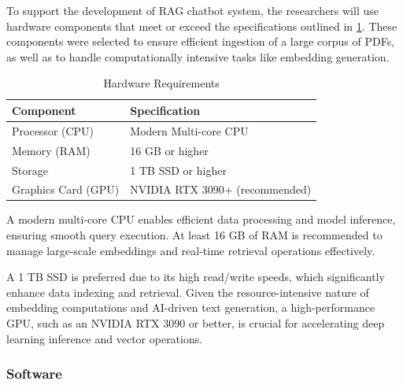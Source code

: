 \begin{refsection}
To support the development of RAG chatbot system, the researchers will use hardware components that meet or exceed the specifications outlined in \ref{tab:hardware_requirements}. These components were selected to ensure efficient ingestion of a large corpus of PDFs, as well as to handle computationally intensive tasks like embedding generation.

\begin{table}[H]
    \centering
    \caption{Hardware Requirements}
    \label{tab:hardware_requirements}
    \begin{tabular}{ll}
        \hline
        \textbf{Component}       & \textbf{Specification}                     \\ \hline
        Processor (CPU)          & Modern Multi-core CPU                      \\
        Memory (RAM)             & 16 GB or higher                            \\
        Storage                  & 1 TB SSD or higher                         \\
        Graphics Card (GPU)      & NVIDIA RTX 3090+ (recommended)             \\
        \hline
    \end{tabular}
\end{table}

A modern multi-core CPU enables efficient data processing and model inference, ensuring smooth query execution. At least 16 GB of RAM is recommended to manage large-scale embeddings and real-time retrieval operations effectively. 

A 1 TB SSD is preferred due to its high read/write speeds, which significantly enhance data indexing and retrieval. Given the resource-intensive nature of embedding computations and AI-driven text generation, a high-performance GPU, such as an NVIDIA RTX 3090 or better, is crucial for accelerating deep learning inference and vector operations.

\subsubsection{Software}


\end{refsection}
